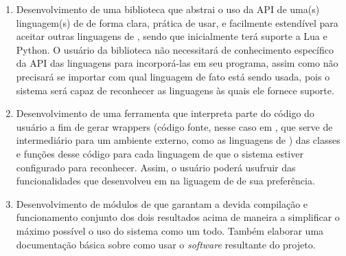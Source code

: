 \begin{enumerate}
  \item Desenvolvimento de uma biblioteca \CXX{} que abstrai o uso da API de uma(s)
        linguagem(s) de \script{} de forma clara, prática de usar, e facilmente
        estendível para aceitar outras linguagens de \script{}, sendo que
        inicialmente terá suporte a Lua e Python. O usuário da biblioteca não
        necessitará de conhecimento específico da API das linguagens para
        incorporá-las em seu programa, assim como não precisará se importar com
        qual linguagem de fato está sendo usada, pois o sistema será capaz de
        reconhecer as linguagens às quais ele fornece suporte.
  \item Desenvolvimento de uma ferramenta que interpreta parte do código \CXX{} do
        usuário a fim de gerar wrappers (código fonte, nesse caso em \CXX{}, que
        serve de intermediário para um ambiente externo, como as linguagens de
        \script{}) das classes e funções desse código para cada linguagem de \script{}
        que o sistema estiver configurado para reconhecer. Assim, o usuário
        poderá usufruir das funcionalidades que desenvolveu em \CXX{} na liguagem
        de \script{} de sua preferência.
  \item Desenvolvimento de módulos de  que garantam a devida
        compilação e funcionamento conjunto dos dois resultados acima de maneira
        a simplificar o máximo possível o uso do sistema como um todo. Também
        elaborar uma documentação básica sobre como usar o \emph{software}
        resultante do projeto.
\end{enumerate}








